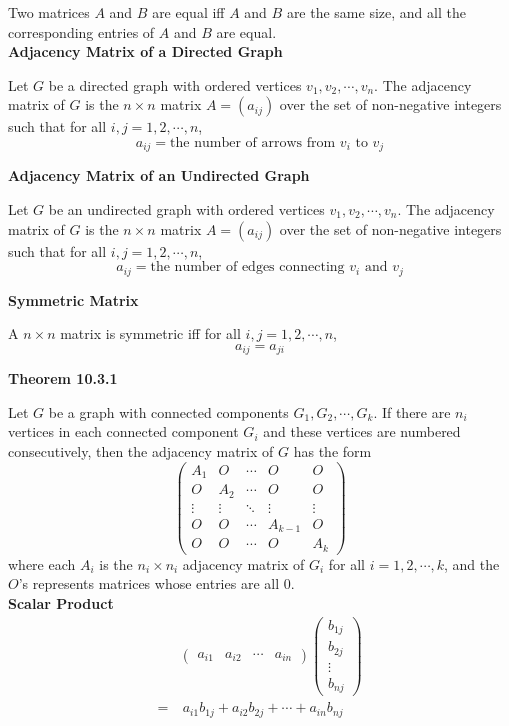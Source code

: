 \documentclass[a4paper]{article}
\newcommand{\subheading}[1]{{\scriptsize\textbf{#1}}}
\begin{document}
\begin{multicols*}{4}
Two matrices $A$ and $B$ are equal iff $A$ and $B$ are the same size, and all
the corresponding entries of $A$ and $B$ are equal.\\

\subheading{Adjacency Matrix of a Directed Graph}

Let $G$ be a directed graph with ordered vertices $v_1, v_2, \cdots, v_n$. The
adjacency matrix of $G$ is the $n \times n$ matrix $A = (a_{ij})$ over the set
of non-negative integers such that for all $i, j = 1,2,\cdots, n$,
$$a_{ij} = \text{the number of arrows from $v_i$ to $v_j$}$$

\subheading{Adjacency Matrix of an Undirected Graph}

Let $G$ be an undirected graph with ordered vertices $v_1, v_2, \cdots, v_n$.
The adjacency matrix of $G$ is the $n \times n$ matrix $A = (a_{ij})$ over the
set of non-negative integers such that for all $i, j = 1,2,\cdots, n$,
$$a_{ij} = \text{the number of edges connecting $v_i$ and $v_j$}$$

\subheading{Symmetric Matrix}

A $n \times n$ matrix is symmetric iff for all $i, j = 1, 2, \cdots, n$,
$$a_{ij} = a_{ji}$$

\subheading{Theorem 10.3.1}

Let $G$ be a graph with connected components $G_1, G_2, \cdots, G_k$. If there
are $n_i$ vertices in each connected component $G_i$ and these vertices are
numbered consecutively, then the adjacency matrix of $G$ has the form
$$\begin{pmatrix}
  A_1    & O      & \cdots & O       & O \\
  O      & A_2    & \cdots & O       & O \\
  \vdots & \vdots & \ddots & \vdots  & \vdots \\
  O      & O      & \cdots & A_{k-1} & O \\
  O      & O      & \cdots & O       & A_k
\end{pmatrix}$$
where each $A_i$ is the $n_i \times n_i$ adjacency matrix of $G_i$ for all $i =
1, 2, \cdots, k$, and the $O$'s represents matrices whose entries are all $0$.\\

\subheading{Scalar Product}
\begin{align*}
  &\begin{pmatrix} a_{i1} & a_{i2} & \cdots & a_{in} \end{pmatrix}
    \begin{pmatrix} b_{1j} \\ b_{2j} \\ \vdots \\ b_{nj} \end{pmatrix}\\
  = &\ a_{i1}b_{1j} + a_{i2}b_{2j} + \cdots + a_{in}b_{nj}
\end{align*}


\end{multicols*}
\end{document}
